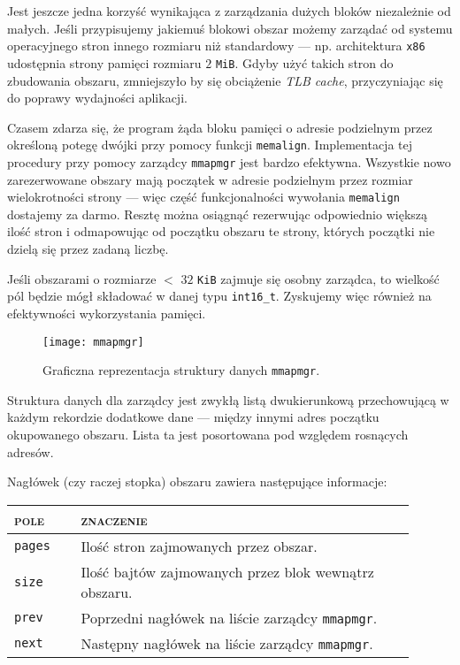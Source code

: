 \documentclass[12pt,a4paper,titlepage,twoside]{mwart}
\begin{document}
Jest jeszcze jedna korzyść wynikająca z zarządzania dużych bloków niezależnie
od małych. Jeśli przypisujemy jakiemuś blokowi obszar możemy zarządać od
systemu operacyjnego stron innego rozmiaru niż standardowy --- np. architektura
\verb+x86+ udostępnia strony pamięci rozmiaru $2$ \verb+MiB+. Gdyby użyć takich
stron do zbudowania obszaru, zmniejszyło by się obciążenie \textit{TLB cache},
przyczyniając się do poprawy wydajności aplikacji.

Czasem zdarza się, że program żąda bloku pamięci o adresie podzielnym przez
określoną potegę dwójki przy pomocy funkcji \verb+memalign+. Implementacja tej
procedury przy pomocy zarządcy \texttt{mmapmgr} jest bardzo efektywna.
Wszystkie nowo zarezerwowane obszary mają początek w adresie podzielnym przez
rozmiar wielokrotności strony --- więc część funkcjonalności wywołania
\verb+memalign+ dostajemy za darmo. Resztę można osiągnąć rezerwując
odpowiednio większą ilość stron i odmapowując od początku obszaru te strony,
których początki nie dzielą się przez zadaną liczbę.

Jeśli obszarami o rozmiarze $<$ $32$ \verb+KiB+ zajmuje się osobny zarządca, to
wielkość pól będzie mógł składować w danej typu \verb+int16_t+. Zyskujemy więc
również na efektywności wykorzystania pamięci.

\begin{figure}[ht]
\centering
\texttt{[image: mmapmgr]}
\caption{Graficzna reprezentacja struktury danych \texttt{mmapmgr}.}
\end{figure}

Struktura danych dla zarządcy jest zwykłą listą dwukierunkową przechowującą w
każdym rekordzie dodatkowe dane --- między innymi adres początku okupowanego
obszaru. Lista ta jest posortowana pod względem rosnących adresów.

Nagłówek (czy raczej stopka) obszaru zawiera następujące informacje:
\begin{center}
\begin{tabular}{|m{0.15\linewidth}|p{0.75\linewidth}|}
\hline
\textsc{pole} & \textsc{znaczenie} \\
\hline
\hline
\verb+pages+ & Ilość stron zajmowanych przez obszar. \\
\hline
\verb+size+	 & Ilość bajtów zajmowanych przez blok wewnątrz obszaru. \\
\hline
\verb+prev+	 & Poprzedni nagłówek na liście zarządcy \texttt{mmapmgr}. \\
\hline
\verb+next+	 & Następny nagłówek na liście zarządcy \texttt{mmapmgr}. \\
\hline
\end{tabular}
\end{center}
\end{document}
